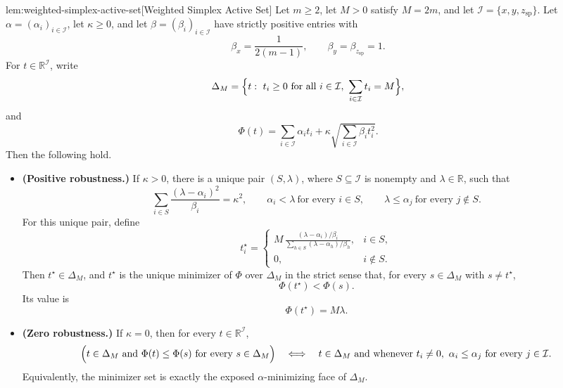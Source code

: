 \documentclass[11pt]{article}
\begin{document}
\begin{lemmav}{lem:weighted-simplex-active-set}[Weighted Simplex Active Set]
Let \(m\ge 2\), let \(M>0\) satisfy \(M=2m\), and let
\(\mathcal I=\{x,y,z_{\mathrm{sp}}\}\). Let
\(\alpha=(\alpha_i)_{i\in\mathcal I}\), let \(\kappa\ge 0\), and let
\(\beta=(\beta_i)_{i\in\mathcal I}\) have strictly positive entries with
\[
  \beta_x=\frac{1}{2(m-1)},\qquad
  \beta_y=\beta_{z_{\mathrm{sp}}}=1 .
\]
For \(t\in\mathbb R^{\mathcal I}\), write
\[
  \Delta_M=\Bigl\{t:\ t_i\ge 0\ \text{for all }i\in\mathcal I,\ 
  \sum_{i\in\mathcal I}t_i=M\Bigr\},
\]
and
\[
  \Phi(t)=\sum_{i\in\mathcal I}\alpha_i t_i
  +\kappa\sqrt{\sum_{i\in\mathcal I}\beta_i t_i^2}.
\]
Then the following hold.
\begin{itemize}
\item \textbf{(Positive robustness.)} If \(\kappa>0\), there is a unique pair
\((S,\lambda)\), where \(S\subseteq\mathcal I\) is nonempty and
\(\lambda\in\mathbb R\), such that
\[
  \sum_{i\in S}\frac{(\lambda-\alpha_i)^2}{\beta_i}=\kappa^2,\qquad
  \alpha_i<\lambda\ \text{for every }i\in S,\qquad
  \lambda\le \alpha_j\ \text{for every }j\notin S .
\]
For this unique pair, define
\[
  t_i^\star=
  \begin{cases}
  \displaystyle
  M\,\frac{(\lambda-\alpha_i)/\beta_i}
  {\sum_{h\in S}(\lambda-\alpha_h)/\beta_h}, & i\in S,\\[1.1em]
  0, & i\notin S .
  \end{cases}
\]
Then \(t^\star\in\Delta_M\), and \(t^\star\) is the unique minimizer of
\(\Phi\) over \(\Delta_M\) in the strict sense that, for every
\(s\in\Delta_M\) with \(s\ne t^\star\),
\[
  \Phi(t^\star)<\Phi(s).
\]
Its value is
\[
  \Phi(t^\star)=M\lambda .
\]

\item \textbf{(Zero robustness.)} If \(\kappa=0\), then for every
\(t\in\mathbb R^{\mathcal I}\),
\[
  \Bigl(t\in\Delta_M\ \text{and}\ 
  \Phi(t)\le \Phi(s)\ \text{for every }s\in\Delta_M\Bigr)
  \quad\Longleftrightarrow\quad
  t\in\Delta_M\ \text{and whenever }t_i\ne 0,\ 
  \alpha_i\le \alpha_j\ \text{for every }j\in\mathcal I .
\]
Equivalently, the minimizer set is exactly the exposed
\(\alpha\)-minimizing face of \(\Delta_M\).
\end{itemize}
\end{lemmav}
\end{document}
